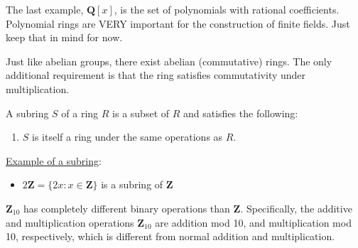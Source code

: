 The last example, $\mathbf{Q}[x]$, is the set of polynomials with rational coefficients. Polynomial rings are VERY important for the construction of finite fields. Just keep that in mind for now.

Just like abelian groups, there exist abelian (commutative) rings. The only additional requirement is that the ring satisfies commutativity under multiplication.
    
\begin{definition}
A subring $S$ of a ring $R$ is a subset of $R$ and satisfies the following:
\begin{enumerate}
    \item $S$ is itself a ring under the same operations as $R$.
\end{enumerate}
\end{definition}

\begin{center}
    \underline{Example of a subring}:
\end{center}

\begin{itemize}
    \item $2\mathbf{Z} = \{2x: x\in\mathbf{Z}\}$ is a subring of $\mathbf{Z}$
\end{itemize}

$\mathbf{Z}_{10}$ has completely different binary operations than $\mathbf{Z}$. Specifically, the additive and multiplication operations $\mathbf{Z}_{10}$ are addition mod 10, and multiplication mod 10, respectively, which is different from normal addition and multiplication.
